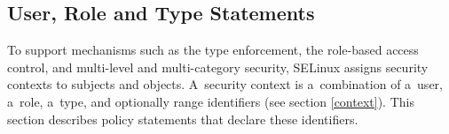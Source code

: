 
\subsection{User, Role and Type Statements}
\label{userroletype}
To support mechanisms such as the type enforcement, the role-based access
control, and multi-level and multi-category security, SELinux assigns security
contexts to subjects and objects. A~security context is a~combination of a~user,
a~role, a~type, and optionally range identifiers (see section \ref{context}).
This section describes policy statements that declare these identifiers.

